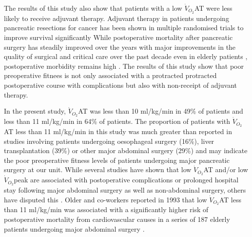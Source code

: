 The results of this study also show that patients with a low $\dot{V}_{O_2}$AT were less likely to receive adjuvant therapy. 
Adjuvant therapy in patients undergoing pancreatic resections for cancer has been shown in multiple randomised trials to improve survival significantly \parencite{neoptolemos_randomized_2004, neoptolemos_adjuvant_2009}
While postoperative mortality after pancreatic surgery has steadily improved over the years with major improvements in the quality of surgical and critical care over the past decade \parencite{winter_1423_2006} even in elderly patients \parencite{makary_pancreaticoduodenectomy_2006}, postoperative morbidity remains high \parencite{mann_review_2010}. 
The results of this study show that poor preoperative fitnees is not only associated with a protracted protracted postoperative course with complications but also with non-receipt of adjuvant therapy.

In the present study, $\dot{V}_{O_2}$AT was less than 10 ml/kg/min in 49\% of patients and less than 11 ml/kg/min in 64\% of patients. 
The proportion of patients with $\dot{V}_{O_2}$AT less than 11 ml/kg/min in this study was much greater than reported in studies involving patients undergoing oesophageal surgery (16\%),\parencite{forshaw_is_2008} liver transplantation (39\%)\parencite{epstein_aerobic_2004} or other major abdominal surgery (29\%)\parencite{older_preoperative_1993} and may indicate the poor preoperative fitness levels of patients undergoing major pancreatic surgery at our unit. 
While several studies have shown that low $\dot{V}_{O_2}$AT and/or low $\dot{V}_{O_2}$peak are associated with postoperative complications or prolonged hospital stay following major abdominal surgery as well as non-abdominal surgery,\parencite{older_preoperative_1993, epstein_aerobic_2004, mccullough_cardiorespiratory_2006, nagamatsu_preoperative_2001, older_cardiopulmonary_1999, older_clinical_2004} others have disputed this \parencite{forshaw_is_2008, clayton_cardiopulmonary_2011, hightower_pilot_2010}. 
Older and co-workers reported in 1993 that low $\dot{V}_{O_2}$AT less than 11 ml/kg/min was associated with a significantly higher risk of postoperative mortality from cardiovascular causes in a series of 187 elderly patients undergoing major abdominal surgery \parencite{older_preoperative_1993}.

